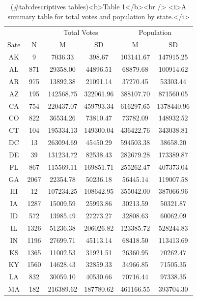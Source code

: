 \documentclass[
  english,
  man]{apa6}
\begin{document}
\begin{table}

\caption{(\#tab:descriptives tables)<b>Table 1</b><br /> <i>A summary table for total votes and population by state.</i>}
\centering
\begin{tabular}[t]{c|c|c|c|c|c}
\hline
\multicolumn{2}{c|}{ } & \multicolumn{2}{c|}{Total Votes} & \multicolumn{2}{c}{Population} \\
\cline{3-4} \cline{5-6}
Sate & N & M & SD & M & SD\\
\hline
AK & 9 & 7036.33 & 398.67 & 103141.67 & 147915.25\\
\hline
AL & 871 & 29358.00 & 44896.51 & 68879.68 & 100914.62\\
\hline
AR & 975 & 13892.38 & 21091.14 & 37270.45 & 53303.44\\
\hline
AZ & 195 & 142568.75 & 322061.96 & 388107.70 & 871560.05\\
\hline
CA & 754 & 220437.07 & 459793.34 & 616297.65 & 1378440.96\\
\hline
CO & 822 & 36534.26 & 73810.47 & 73782.09 & 148932.52\\
\hline
CT & 104 & 195334.13 & 149300.04 & 436422.76 & 343038.81\\
\hline
DC & 13 & 263094.69 & 45450.29 & 594503.38 & 38658.20\\
\hline
DE & 39 & 131234.72 & 82538.43 & 282679.28 & 173389.87\\
\hline
FL & 867 & 115569.11 & 169851.71 & 255262.47 & 407373.04\\
\hline
GA & 2067 & 22354.78 & 50236.18 & 56445.14 & 119007.58\\
\hline
HI & 12 & 107234.25 & 108642.95 & 355042.00 & 387066.96\\
\hline
IA & 1287 & 15009.59 & 25993.86 & 30213.59 & 50321.87\\
\hline
ID & 572 & 13985.49 & 27273.27 & 32808.63 & 60062.09\\
\hline
IL & 1326 & 51236.38 & 206026.82 & 123385.72 & 528244.83\\
\hline
IN & 1196 & 27699.71 & 45113.14 & 68418.50 & 113413.69\\
\hline
KS & 1365 & 11002.53 & 31921.51 & 26360.95 & 70262.47\\
\hline
KY & 1560 & 14628.43 & 32859.33 & 34966.85 & 71505.35\\
\hline
LA & 832 & 30059.10 & 40530.66 & 70716.44 & 97338.35\\
\hline
MA & 182 & 216389.62 & 187780.62 & 461166.55 & 393704.30\\

\end{tabular}
\end{table}
\end{document}
